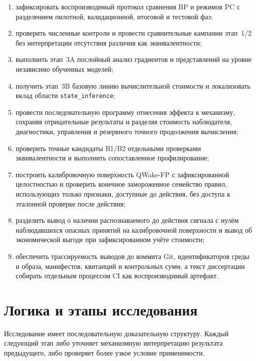 \begin{enumerate}
  \item зафиксировать воспроизводимый протокол сравнения BP и режимов PC с
  разделением пилотной, валидационной, итоговой и тестовой фаз;
  \item проверить численные контроли и провести сравнительные кампании
  этап~1/2 без интерпретации отсутствия различия как эквивалентности;
  \item выполнить этап~3A послойный анализ градиентов и представлений на уровне
  независимо обученных моделей;
  \item получить этап~3B базовую линию вычислительной стоимости и локализовать
  вклад области \texttt{state\_inference};
  \item провести последовательную программу отнесения эффекта к механизму,
  сохраняя отрицательные результаты и разделяя стоимость наблюдателя,
  диагностики, управления и резервного точного продолжения вычисления;
  \item проверить точные кандидаты B1/B2 отдельными проверками эквивалентности и
  выполнить сопоставленное профилирование;
  \item построить калибровочную поверхность QWake-FP с зафиксированной целостностью
  и проверить конечное замороженное семейство правил, использующих только
  признаки, доступные до действия, без доступа к эталонной проверке после действия;
  \item разделить вывод о наличии распознаваемого до действия сигнала с нулём
  наблюдавшихся опасных принятий на калибровочной поверхности и вывод об
  экономической выгоде при зафиксированном учёте стоимости;
  \item обеспечить трассируемость выводов до коммита Git, идентификаторов среды
  и образа, манифестов, квитанций и контрольных сумм, а текст диссертации
  собирать отдельным процессом CI как воспроизводимый артефакт.
\end{enumerate}

\section{Логика и этапы исследования}
\label{sec:intro-logic}

Исследование имеет последовательную доказательную структуру. Каждый следующий
этап либо уточняет механизмную интерпретацию результата предыдущего, либо
проверяет более узкое условие применимости.

